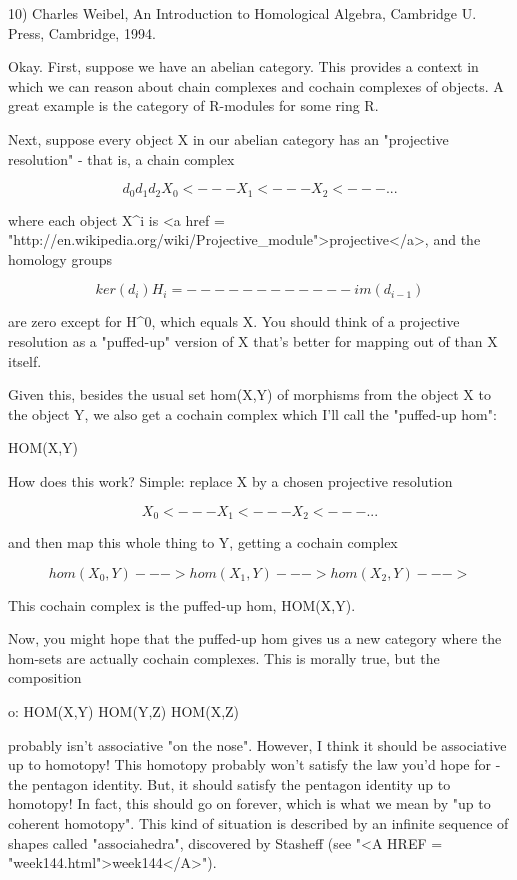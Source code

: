 10) Charles Weibel, An Introduction to Homological Algebra, 
Cambridge U. Press, Cambridge, 1994. 

Okay.  First, suppose we have an abelian category.  This provides a 
context in which we can reason about chain complexes and cochain 
complexes of objects.  A great example is the category of R-modules 
for some ring R.  

Next, suppose every object X in our abelian category has an 
"projective resolution" - that is, a chain complex 


$$

    d_{0}      d_{1}      d_{2}
X_{0} <--- X_{1} <--- X_{2} <--- ...
$$
    
where each object X^{i} is 
<a href = "http://en.wikipedia.org/wiki/Projective_module">projective</a>, and the homology groups


$$

          ker (d_{i})  
H_{i} =    ------------
          im (d_{i-1})
$$
    
are zero except for H^{0}, which equals X.  You should think of
a projective resolution as a "puffed-up" version of X that's
better for mapping out of than X itself.  

Given this, besides the usual set hom(X,Y) of morphisms from the 
object X to the object Y, we also get a cochain complex which I'll 
call the "puffed-up hom":

HOM(X,Y)

How does this work?  Simple: replace X by a chosen projective
resolution 


$$

X_{0} <--- X_{1} <--- X_{2} <--- ...
$$
    

and then map this whole thing to Y, getting a cochain complex


$$

hom(X_{0},Y) ---> hom(X_{1},Y) ---> hom(X_{2},Y) --- >
$$
    
This cochain complex is the puffed-up hom, HOM(X,Y).  

Now, you might hope that the puffed-up hom gives us a new category 
where the hom-sets are actually cochain complexes.  This is morally
true, but the composition

o: HOM(X,Y) \times  HOM(Y,Z) \to  HOM(X,Z)

probably isn't associative "on the nose".  However, I think
it should be associative up to homotopy!  This homotopy probably won't
satisfy the law you'd hope for - the pentagon identity.  But, it
should satisfy the pentagon identity up to homotopy!  In fact, this
should go on forever, which is what we mean by "up to coherent
homotopy".  This kind of situation is described by an infinite
sequence of shapes called "associahedra", discovered by
Stasheff (see "<A HREF = "week144.html">week144</A>").

